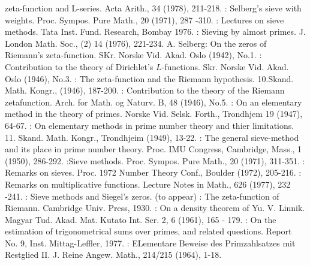 \begin{thebibliography}{99}
  zeta-function and  L-series. Acta Arith., 34 (1978), 211-218.  
: Selberg's sieve with
  weights. Proc. Sympos. Pure Math., 20 (1971), 287 -310. 
: Lectures on sieve methods.  Tata
  Inst. Fund. Research, Bombay 1976. 
: Sieving by almost
  primes. J. London Math. Soc., (2) 14 (1976), 221-234. 
 {A. Selberg}: On the zeros of Riemann's
  zeta-function. SKr. Norske Vid. Akad. Oslo (1942), No.1. 
: Contribution to the theory of Dirichlet's
  $L$-functions. Skr. Norske Vid. Akad. Oslo (1946), No.3. 
: The zeta-function and the Riemann
  hypothesis.  10.Skand. Math. Kongr., (1946), 187-200. 
: Contribution to  the theory of  the  Riemann
  zetafunction. Arch. for Math. og Naturv. B, 48 (1946), No.5. 
: On an elementary method in the theory of
  primes. Norske Vid. Selsk. Forth., Trondhjem 19 (1947), 64-67. 
: On elementary methods in prime number theory
  and  thier limitations. 11. Skand. Math. Kongr., Trondhjeim
  (1949), 13-22. 
: The general sieve-method and  its place in
  prime number theory. Proc. IMU Congress, Cambridge, Mass., 1 (1950),
  286-292.  
:\pageoriginale Sieve methods. Proc. Sympos. Pure Math.,  20
  (1971), 311-351. 
: Remarks on sieves. Proc. 1972 Number Theory
  Conf., Boulder (1972),  205-216. 
: Remarks on  multiplicative
  functions. Lecture  Notes in Math., 626 (1977),  232 -241. 
: Sieve methods and Siegel's zeros.  (to appear) 
: The zeta-function of
  Riemann. Cambridge Univ. Press, 1930. 
: On a density theorem of
  Yu. V. Linnik. Magyar Tud. Akad. Mat. Kutato Int. Ser.  2, 6 (1961),
  165 - 179.   
: On the  estimation of trigonometrical sums
  over  primes, and  related questions. Report No. 9,
  Inst. Mittag-Leffler,  1977.  
: ELementare Beweise des Primzahlsatzes mit
  Restglied II. J. Reine Angew. Math.,  214/215  (1964),   1-18.  
\end{thebibliography}
